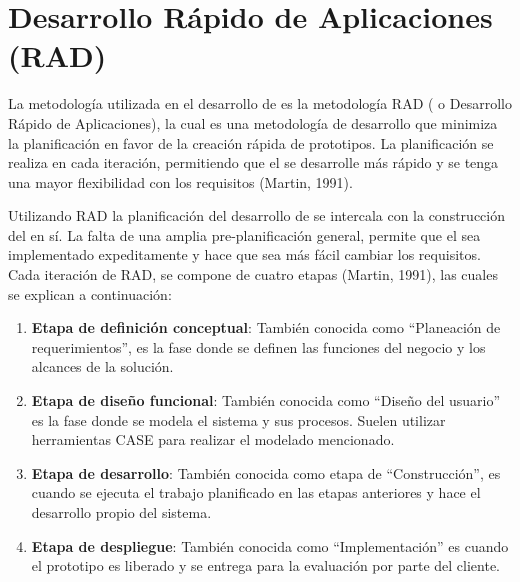 \section{Desarrollo Rápido de Aplicaciones (RAD)}
La metodología utilizada en el desarrollo de  es la metodología RAD ( o Desarrollo Rápido de Aplicaciones), la cual es una metodología de desarrollo que minimiza la planificación en favor de la creación rápida de prototipos. La planificación se realiza en cada iteración, permitiendo que el  se desarrolle más rápido y se tenga una mayor flexibilidad con los requisitos (Martin, 1991).

Utilizando RAD la planificación del desarrollo de  se intercala con la construcción del  en sí. La falta de una amplia pre-planificación general, permite que el  sea implementado expeditamente y hace que sea más fácil cambiar los requisitos. Cada iteración de RAD, se compone de cuatro etapas (Martin, 1991), las cuales se explican a continuación: 

\begin{enumerate}
	\item \textbf{Etapa de definición conceptual}: También conocida como “Planeación de requerimientos”, es la fase donde se definen las funciones del negocio y los alcances de la solución.
	\item \textbf{Etapa de diseño funcional}: También conocida como “Diseño del usuario” es la fase donde se modela el sistema y sus procesos. Suelen utilizar herramientas CASE para realizar el modelado mencionado.
	\item \textbf{Etapa de desarrollo}: También conocida como etapa de “Construcción”, es cuando se ejecuta el trabajo planificado en las etapas anteriores y hace el desarrollo propio del sistema.
	\item \textbf{Etapa de despliegue}: También conocida como “Implementación” es cuando el prototipo es liberado y se entrega para la evaluación por parte del cliente. 
\end{enumerate}


\begin{center}
\end{center}

